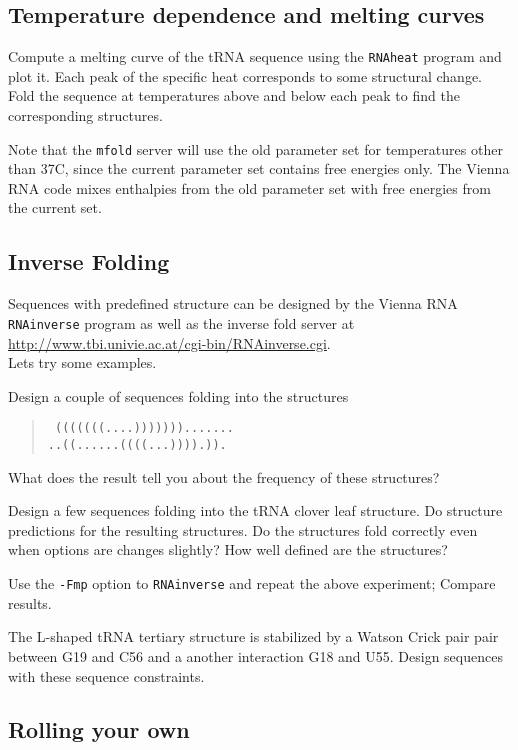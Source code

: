\documentclass{article}
\begin{document}
\subsection{Temperature dependence and melting curves}

Compute a melting curve of the tRNA sequence using the {\tt RNAheat}
program and plot it. Each peak of the specific heat corresponds to some
structural change. Fold the sequence at temperatures above and below each
peak to find the corresponding structures.

Note that the {\tt mfold} server will use the old parameter set for
temperatures other than 37C, since the current parameter set contains free
energies only. The Vienna RNA code mixes enthalpies from the old parameter
set with free energies from the current set.

\subsection{Inverse Folding}

Sequences with predefined structure can be designed by the Vienna RNA {\tt
RNAinverse} program as well as the inverse fold server at\\
\url{http://www.tbi.univie.ac.at/cgi-bin/RNAinverse.cgi}.\\
Lets try some examples.

Design a couple of sequences folding into the structures
\begin{quote}\tt
(((((((....))))))).......\\
..((......((((...)))).)).\\
\end{quote}

What does the result tell you about the frequency of these structures?

Design a few sequences folding into the tRNA clover leaf structure. Do
structure predictions for the resulting structures. Do the structures fold
correctly even when options are changes slightly? How well defined are the
structures?

Use the {\tt -Fmp} option to {\tt RNAinverse} and repeat the above
experiment; Compare results. 

The L-shaped tRNA tertiary structure is stabilized by a Watson Crick pair
pair between G19 and C56 and a another interaction G18 and U55. Design
sequences with these sequence constraints.

\subsection{Rolling your own}
\end{document}
